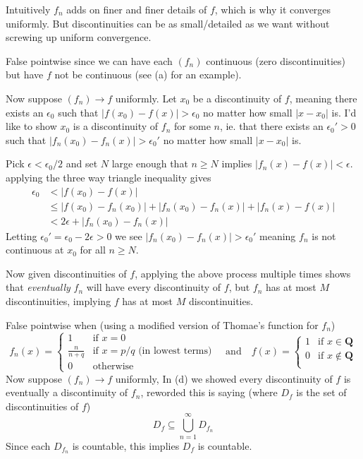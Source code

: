 \begin{solution}
{    Intuitively $f_n$ adds on finer and finer details of $f$, which is why it converges uniformly. But discontinuities can be as small/detailed as we want without screwing up uniform convergence. 
  \item False pointwise since we can have each $(f_n)$ continuous (zero discontinuities) but have $f$ not be continuous (see (a) for an example).

    Now suppose $(f_n) \to f$ uniformly. Let $x_0$ be a discontinuity of $f$, meaning there exists an $\epsilon_0$ such that $|f(x_0)-f(x)| > \epsilon_0$ no matter how small $|x-x_0|$ is.
    I'd like to show $x_0$ is a discontinuity of $f_n$ for some $n$, ie. that there exists an $\epsilon_0'>0$ such that $|f_n(x_0)-f_n(x)|>\epsilon_0'$ no matter how small $|x-x_0|$ is.

    Pick $\epsilon<\epsilon_0/2$ and set $N$ large enough that $n \ge N$ implies $|f_n(x)-f(x)|<\epsilon$. applying the three way triangle inequality gives
    $$
    \begin{aligned}
    \epsilon_0
    &< |f(x_0) - f(x)| \\
    &\le |f(x_0) - f_n(x_0)| + |f_n(x_0) - f_n(x)| + |f_n(x) - f(x)| \\
    &< 2\epsilon + |f_n(x_0) - f_n(x)|
    \end{aligned}
    $$
    Letting $\epsilon_0' = \epsilon_0-2\epsilon > 0$ we see $|f_n(x_0) - f_n(x)| > \epsilon_0'$ meaning $f_n$ is not continuous at $x_0$ for all $n \ge N$.

    Now given discontinuities of $f$, applying the above process multiple times shows that \emph{eventually} $f_n$ will have every discontinuity of $f$, but $f_n$ has at most $M$ discontinuities, implying $f$ has at most $M$ discontinuities.
  \item False pointwise when (using a modified version of Thomae's function for $f_n$)
    $$
    f_n(x) = \begin{cases}
      1 &\text{if $x = 0$} \\
      \frac{n}{n+q} &\text{if $x = p/q$ (in lowest terms)} \\
      0 &\text{otherwise}
    \end{cases}
    \quad\text{and}\quad
    f(x) = \begin{cases}
      1 &\text{if $x \in \mathbf{Q}$} \\
      0 &\text{if $x \notin \mathbf{Q}$} \\
    \end{cases}
    $$
    Now suppose $(f_n) \to f$ uniformly, In (d) we showed every discontinuity of $f$ is eventually a discontinuity of $f_n$, reworded this is saying (where $D_f$ is the set of discontinuities of $f$)
    $$
    D_f \subseteq \bigcup_{n=1}^\infty D_{f_{n}}
    $$
    Since each $D_{f_n}$ is countable, this implies $D_f$ is countable.
  }
\end{solution}
